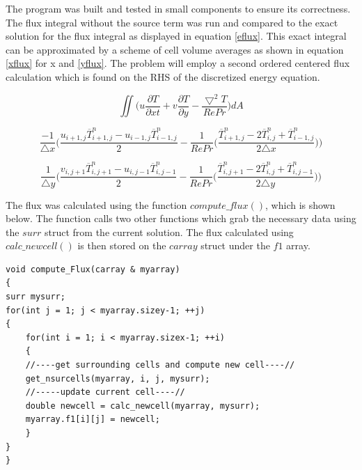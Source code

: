 \documentclass[paper=a4, fontsize=11pt, abstract=on]{scrartcl}
\numberwithin{equation}{section}		%
\numberwithin{figure}{section}			%
\numberwithin{table}{section}				%
\begin{document}
 The program was built and tested in small components to ensure its correctness. The flux integral without the source term was run and compared to the exact solution for the flux integral as displayed in equation \ref{eflux}. This exact integral can be approximated by a scheme of cell volume averages as shown in equation \ref{xflux} for x and \ref{yflux}. The problem will employ a second ordered centered flux calculation which is found on the RHS of the discretized energy equation.


\begin{equation}
\label{eflux}
\iint \Bigg(u\frac{\partial T}{\partial xt} + v\frac{\partial T}{\partial y}-\frac{\bigtriangledown^2T}{Re Pr}\Bigg)dA
\end{equation}



  \begin{equation}
\label{xflux}
\frac{-1}{\triangle x}\Bigg(\frac{u_{i+1,j}\overline{T}_{i+1,j}^n-u_{i-1,j}\overline{T}_{i-1,j}^n}{2}-\frac{1}{Re Pr}\Bigg(\frac{\overline{T}_{i+1,j}^n-2\overline{T}_{i,j}^n+\overline{T}_{i-1,j}^n}{2\triangle x}\Bigg)\Bigg)
\end{equation}

 \begin{equation}
\label{yflux}
 \frac{1}{\triangle y}\Bigg(\frac{v_{i,j+1}\overline{T}_{i,j+1}^n-u_{i,j-1}\overline{T}_{i,j-1}^n}{2}-\frac{1}{Re Pr}\Bigg(\frac{\overline{T}_{i,j+1}^n-2\overline{T}_{i,j}^n+\overline{T}_{i,j-1}^n}{2\triangle y}\Bigg)\Bigg)
\end{equation}

The flux was calculated using the function $compute\_ flux()$, which is shown below. The function calls two other functions which grab the necessary data using the $surr$ struct from the current solution. The flux calculated using $calc\_ newcell()$ is then stored on the $carray$ struct under the $f1$ array.

\begin{lstlisting}
void compute_Flux(carray & myarray)
{
surr mysurr;
for(int j = 1; j < myarray.sizey-1; ++j)
{
    for(int i = 1; i < myarray.sizex-1; ++i)
    {
    //----get surrounding cells and compute new cell----//
    get_nsurcells(myarray, i, j, mysurr);
    //-----update current cell----//
    double newcell = calc_newcell(myarray, mysurr);    
    myarray.f1[i][j] = newcell;   
    }
}
}
\end{lstlisting}
\end{document}
